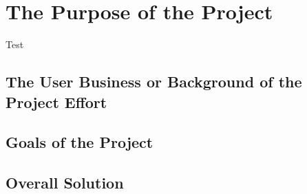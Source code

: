 \chapter{The Purpose of the Project}
Test

\section{The User Business or Background of the Project Effort}

\section{Goals of the Project}

\section{Overall Solution}